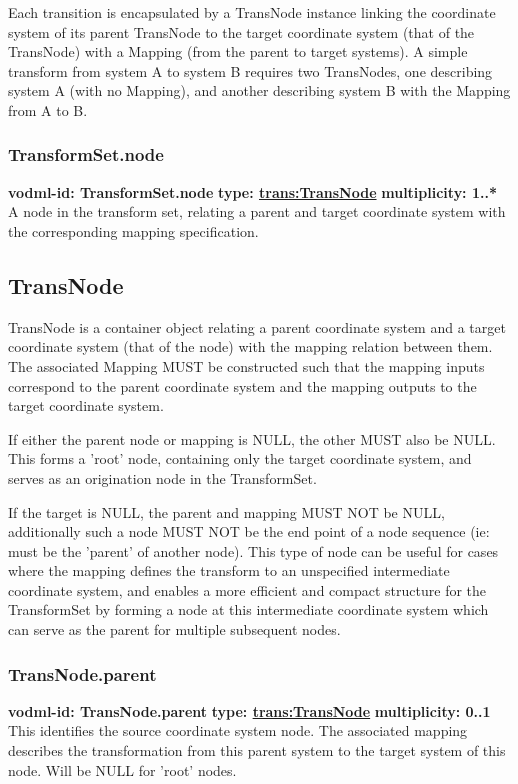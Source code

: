     Each transition is encapsulated by a TransNode instance linking the coordinate system of its parent TransNode to the target coordinate system (that of the TransNode) with a Mapping (from the parent to target systems). A simple transform from system A to system B requires two TransNodes, one describing system A (with no Mapping), and another describing system B with the Mapping from A to B.

    \subsubsection{TransformSet.node}
      \textbf{vodml-id: TransformSet.node} \newline
      \textbf{type: \hyperref[sect:TransNode]{trans:TransNode}} \newline
      \textbf{multiplicity: 1..*} \newline 
      A node in the transform set, relating a parent and target coordinate system with the corresponding mapping specification.

  \subsection{TransNode}
  \label{sect:TransNode}
    TransNode is a container object relating a parent coordinate system and a target coordinate system (that of the node) with the mapping relation between them. The associated Mapping MUST be constructed such that the mapping inputs correspond to the parent coordinate system and the mapping outputs to the target coordinate system. 

    If either the parent node or mapping is NULL, the other MUST also be NULL. This forms a 'root' node, containing only the target coordinate system, and serves as an origination node in the TransformSet. 

    If the target is NULL, the parent and mapping MUST NOT be NULL, additionally such a node MUST NOT be the end point of a node sequence (ie: must be the 'parent' of another node). This type of node can be useful for cases where the mapping defines the transform to an unspecified intermediate coordinate system, and enables a more efficient and compact structure for the TransformSet by forming a node at this intermediate coordinate system which can serve as the parent for multiple subsequent nodes.

    \subsubsection{TransNode.parent}
      \textbf{vodml-id: TransNode.parent} \newline
      \textbf{type: \hyperref[sect:TransNode]{trans:TransNode}} \newline
      \textbf{multiplicity: 0..1} \newline 
      This identifies the source coordinate system node. The associated mapping describes the transformation from this parent system to the target system of this node. Will be NULL for 'root' nodes.

